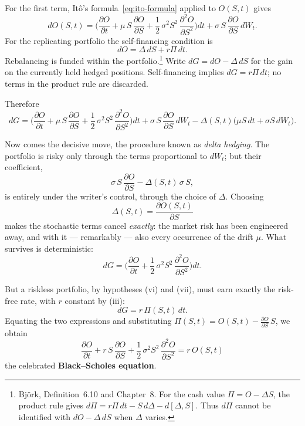 For the first term, It\^o's formula~\eqref{eq:ito-formula} applied to $O(S,t)$ gives
\begin{equation}
dO(S,t) = \biggl(\frac{\partial O}{\partial t} + \mu\, S\,\frac{\partial O}{\partial S} + \frac{1}{2}\,\sigma^2 S^2\,\frac{\partial^2 O}{\partial S^2}\biggr)dt + \sigma\, S\,\frac{\partial O}{\partial S}\, dW_t.
\end{equation}
For the replicating portfolio the self-financing condition is
\[
 dO=\Delta\,dS+r\Pi\,dt.
\]
Rebalancing is funded within the portfolio.\footnote{Bj\"ork\cite{Bjork2020}, Definition~6.10 and Chapter~8.
For the cash value $\Pi=O-\Delta S$, the product rule gives $d\Pi=r\Pi\,dt-S\,d\Delta-d[\Delta,S]$.
Thus $d\Pi$ cannot be identified with $dO-\Delta\,dS$ when $\Delta$ varies.}
Write $dG=dO-\Delta\,dS$ for the gain on the currently held hedged positions.
Self-financing implies $dG=r\Pi\,dt$; no terms in the product rule are discarded.


Therefore
\begin{equation}
dG = \biggl(\frac{\partial O}{\partial t} + \mu\, S\,\frac{\partial O}{\partial S} + \frac{1}{2}\,\sigma^2 S^2\,\frac{\partial^2 O}{\partial S^2}\biggr)dt + \sigma\, S\,\frac{\partial O}{\partial S}\, dW_t - \Delta(S,t)\bigl(\mu S\, dt + \sigma S\, dW_t\bigr).
\end{equation}

Now comes the decisive move, the procedure known as \emph{delta hedging}.
The portfolio is risky only through the terms proportional to $dW_t$; but their coefficient,
\begin{equation}
\sigma\, S\,\frac{\partial O}{\partial S} - \Delta(S,t)\,\sigma\, S,
\end{equation}
is entirely under the writer's control, through the choice of $\Delta$.
Choosing
\begin{equation}
\Delta(S,t) = \frac{\partial O(S,t)}{\partial S}
\end{equation}
makes the stochastic terms cancel \emph{exactly}: the market risk has been engineered away, and with it --- remarkably --- also every occurrence of the drift $\mu$.
What survives is deterministic:
\begin{equation}
dG = \biggl(\frac{\partial O}{\partial t} + \frac{1}{2}\,\sigma^2 S^2\,\frac{\partial^2 O}{\partial S^2}\biggr)dt.
\end{equation}

But a riskless portfolio, by hypotheses (vi) and (vii), must earn exactly the risk-free rate, with $r$ constant by (iii):
\begin{equation}
dG = r\,\Pi(S,t)\, dt.
\end{equation}
Equating the two expressions and substituting $\Pi(S,t) = O(S,t) - \frac{\partial O}{\partial S}\,S$, we obtain
\begin{equation}\label{eq:black-scholes}
\boxed{\frac{\partial O}{\partial t} + r\, S\,\frac{\partial O}{\partial S} + \frac{1}{2}\,\sigma^2 S^2\,\frac{\partial^2 O}{\partial S^2} = r\, O(S,t)}
\end{equation}
the celebrated \textbf{Black--Scholes equation}.

